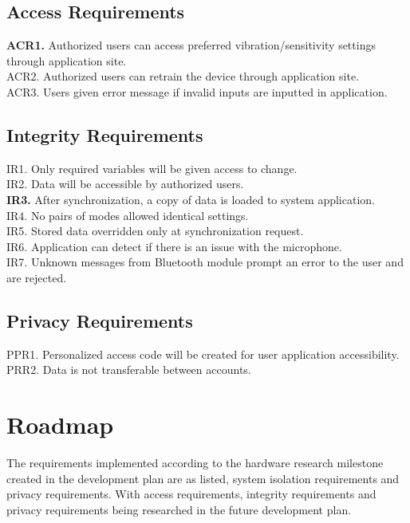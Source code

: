 \documentclass{article}
\begin{document}
\subsection{Access Requirements}

\textbf{ACR1.} Authorized users can access preferred vibration/sensitivity settings through application site.
\\ACR2. Authorized users can retrain the device through application site. 
\\ACR3. Users given error message if invalid inputs are inputted in application.

\subsection{Integrity Requirements}

IR1. Only required variables will be given access to change.
\\IR2. Data will be accessible by authorized users.
\\\textbf{IR3.} After synchronization, a copy of data is loaded to system application.  
\\IR4. No pairs of modes allowed identical settings.
\\IR5. Stored data overridden only at synchronization request.
\\IR6. Application can detect if there is an issue with the microphone.
\\IR7. Unknown messages from Bluetooth module prompt an error to the user and are rejected.
\subsection{Privacy Requirements}

PPR1. Personalized access code will be created for user application accessibility. 
\\PRR2. Data is not transferable between accounts.


\section{Roadmap}

The requirements implemented according to the hardware research milestone created in the development plan are as listed, system isolation requirements and privacy requirements. With access requirements, integrity requirements and privacy requirements being researched in the future development plan.
\end{document}
